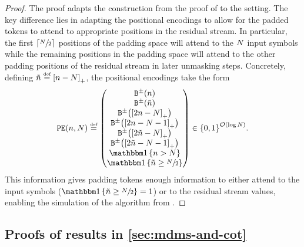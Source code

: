 \RegularLanguagesInMDMEfficientThm*
\begin{proof}
   The proof adapts the construction from the proof of \citet[][Thm. 5.1]{saunshi2025reasoninglatentthoughtspower} to the \MDMAcr setting.
   The key difference lies in adapting the positional encodings to allow for the padded tokens to attend to appropriate positions in the residual stream.
   In particular, the first $\lceil\sfrac{{{N}}}{2}\rceil$ positions of the padding space will attend to the ${{N}}$ input symbols while the remaining positions in the padding space will attend to the other padding positions of the residual stream in later unmasking steps.
   Concretely, defining $\tilde{{{n}}} \mathrel{\stackrel{\textnormal{\tiny def}}{=}} {\left[ {{n}} - {{N}} \right]_{+}}$, the positional encodings take the form
   \begin{equation} 
      \posEncFun{\stridx, \strlen} \defeq 
      \begin{pmatrix}
         \sbinFun{\stridx} \\
         \sbinFun{\tilde{\stridx}}  \\
         \sbinFun{\posPart{2 \stridx - \strlen}}  \\
         \sbinFun{\posPart{2 \stridx - \strlen - 1}}  \\
         \sbinFun{\posPart{2 \tilde{\stridx} - \strlen}}  \\
         \sbinFun{\posPart{2 \tilde{\stridx} - \strlen - 1}}  \\
         \ind{\stridx > \strlen}  \\
         \ind{\tilde{\stridx} \geq \sfrac{\strlen}{2}}  \\
      \end{pmatrix} \in \set{0, 1}^{\bigOFun{\log\strlen}}.
   \end{equation}
   This information gives padding tokens enough information to either attend to the input symbols ($\ind{\tilde{\stridx} \geq \sfrac{\strlen}{2}} = 1$) or to the residual stream values, enabling the simulation of the algorithm from \citet[][Thm. 5.1]{saunshi2025reasoninglatentthoughtspower}.
\end{proof}


\subsection{Proofs of results in \texorpdfstring{\cref{sec:mdms-and-cot}}{Section 3.3}} \label{app:proofs-cot}




